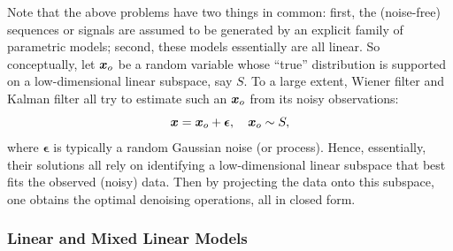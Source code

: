 \documentclass[../../book-main.tex]{subfiles}
\begin{document}
Note that the above problems have two things in common: first, the (noise-free)  sequences or signals are assumed to be generated by an explicit family of parametric models; second, these models essentially are all linear. So conceptually, let $\bm{x}_o$ be a random variable whose ``true'' distribution is supported on a low-dimensional linear subspace, say $S$. To a large extent, Wiener filter and Kalman filter all try to estimate such an $\bm{x}_o$ from its noisy observations:
\begin{equation}
    \bm{x} = \bm{x}_o + \boldsymbol{\epsilon}, \quad \bm{x}_o \sim S, 
\end{equation}
where $\boldsymbol{\epsilon}$ is typically a random Gaussian noise (or process). Hence, essentially, their solutions all rely on identifying a low-dimensional linear subspace that best fits the observed (noisy) data. Then by projecting the data onto this subspace, one obtains the optimal denoising operations, all in closed form.   


\subsubsection{Linear and Mixed Linear Models}
\label{sec:PCA-ICA}
\end{document}
